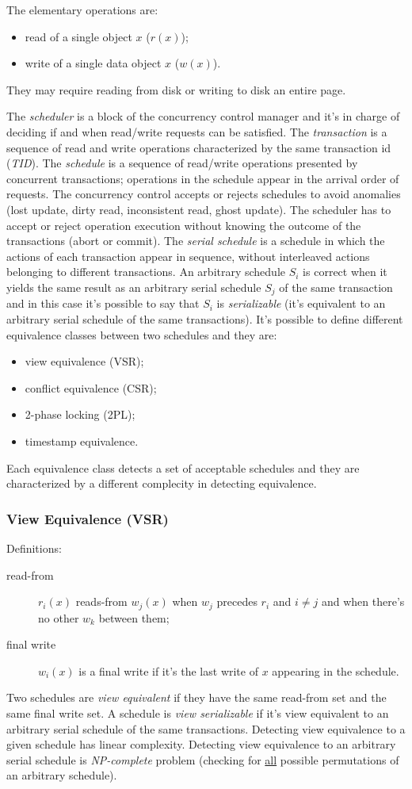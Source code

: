 The elementary operations are:
\begin{itemize}
	\item read of a single object $x$ ($r(x)$);
	\item write of a single data object $x$ ($w(x)$).
\end{itemize}
They may require reading from disk or writing to disk an entire page.

The \emph{scheduler} is a block of the concurrency control manager and it's in charge of deciding if and when read/write requests can be satisfied.
The \emph{transaction} is a sequence of read and write operations characterized by the same transaction id (\emph{TID}).
The \emph{schedule} is a sequence of read/write operations presented by concurrent transactions; operations in
the schedule appear in the arrival order of requests.
The concurrency control accepts or rejects schedules to avoid anomalies (lost update, dirty read, inconsistent read, ghost update).
The scheduler has to accept or reject operation execution without knowing the outcome of the transactions (abort or commit).
The \emph{serial schedule} is a schedule in which the actions of each transaction appear in sequence, without interleaved actions belonging to different transactions.
An arbitrary schedule $S_i$ is correct when it yields the same result as an arbitrary serial schedule $S_j$ of the same transaction and in this case it's possible to say that $S_i$ is \emph{serializable} (it's equivalent to an arbitrary serial schedule of the same transactions).
It's possible to define different equivalence classes between two schedules and they are:
\begin{itemize}
	\item view equivalence (VSR);
	\item conflict equivalence (CSR);
	\item 2-phase locking (2PL);
	\item timestamp equivalence.
\end{itemize}
Each equivalence class detects a set of acceptable schedules and they are characterized by a different complecity in detecting equivalence.

\subsubsection{View Equivalence (VSR)}
Definitions:
\begin{description}
	\item[read-from] $r_i(x)$ reads-from $w_j(x)$ when $w_j$ precedes $r_i$ and $i \neq j$ and when there's no other $w_k$ between them;
	\item[final write] $w_i(x)$ is a final write if it's the last write of $x$ appearing in the schedule.
\end{description}
Two schedules are \emph{view equivalent} if they have the same read-from set and the same final write set.
A schedule is \emph{view serializable} if it's view equivalent to an arbitrary serial schedule of the same transactions.
Detecting view equivalence to a given schedule has linear complexity.
Detecting view equivalence to an arbitrary serial schedule is \emph{NP-complete} problem (checking for \underline{all} possible permutations of an arbitrary schedule).

